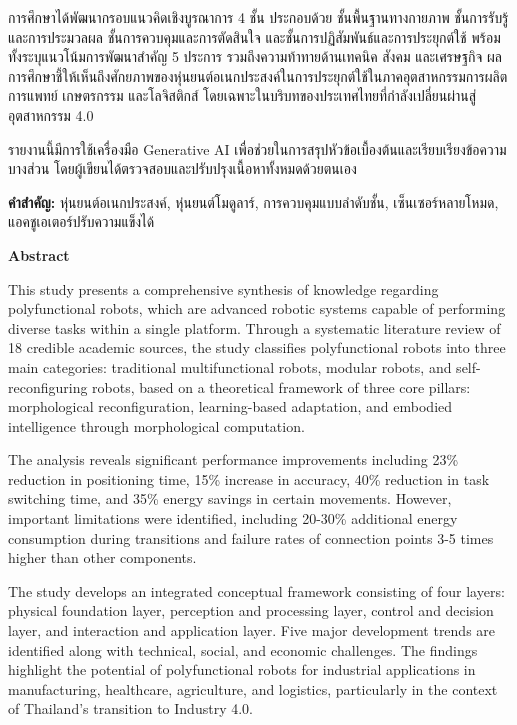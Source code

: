 \documentclass[a4paper]{article}
\begin{document}
การศึกษาได้พัฒนากรอบแนวคิดเชิงบูรณาการ 4 ชั้น ประกอบด้วย ชั้นพื้นฐานทางกายภาพ ชั้นการรับรู้และการประมวลผล ชั้นการควบคุมและการตัดสินใจ และชั้นการปฏิสัมพันธ์และการประยุกต์ใช้ พร้อมทั้งระบุแนวโน้มการพัฒนาสำคัญ 5 ประการ รวมถึงความท้าทายด้านเทคนิค สังคม และเศรษฐกิจ ผลการศึกษาชี้ให้เห็นถึงศักยภาพของหุ่นยนต์อเนกประสงค์ในการประยุกต์ใช้ในภาคอุตสาหกรรมการผลิต การแพทย์ เกษตรกรรม และโลจิสติกส์ โดยเฉพาะในบริบทของประเทศไทยที่กำลังเปลี่ยนผ่านสู่อุตสาหกรรม 4.0

รายงานนี้มีการใช้เครื่องมือ Generative AI เพื่อช่วยในการสรุปหัวข้อเบื้องต้นและเรียบเรียงข้อความบางส่วน โดยผู้เขียนได้ตรวจสอบและปรับปรุงเนื้อหาทั้งหมดด้วยตนเอง

\vspace{1em}
\noindent
\textbf{คำสำคัญ:} หุ่นยนต์อเนกประสงค์, หุ่นยนต์โมดูลาร์, การควบคุมแบบลำดับชั้น, เซ็นเซอร์หลายโหมด, แอคชูเอเตอร์ปรับความแข็งได้

\newpage
{\centering
    {\fontsize{18pt}{21.6pt}\selectfont\textbf{Abstract}\par}
}
\vspace{1em}

This study presents a comprehensive synthesis of knowledge regarding polyfunctional robots, which are advanced robotic systems capable of performing diverse tasks within a single platform. Through a systematic literature review of 18 credible academic sources, the study classifies polyfunctional robots into three main categories: traditional multifunctional robots, modular robots, and self-reconfiguring robots, based on a theoretical framework of three core pillars: morphological reconfiguration, learning-based adaptation, and embodied intelligence through morphological computation.

The analysis reveals significant performance improvements including 23\% reduction in positioning time, 15\% increase in accuracy, 40\% reduction in task switching time, and 35\% energy savings in certain movements. However, important limitations were identified, including 20-30\% additional energy consumption during transitions and failure rates of connection points 3-5 times higher than other components.

The study develops an integrated conceptual framework consisting of four layers: physical foundation layer, perception and processing layer, control and decision layer, and interaction and application layer. Five major development trends are identified along with technical, social, and economic challenges. The findings highlight the potential of polyfunctional robots for industrial applications in manufacturing, healthcare, agriculture, and logistics, particularly in the context of Thailand's transition to Industry 4.0.
\end{document}
